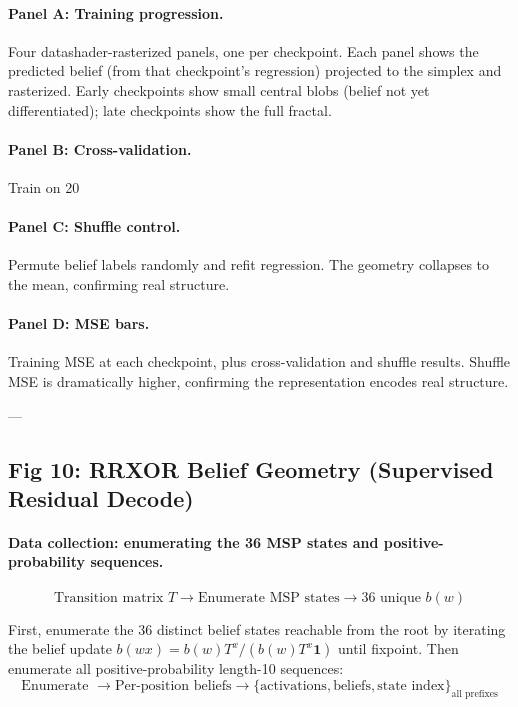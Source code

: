 \documentclass[11pt]{article}
\begin{document}
\paragraph{Panel A: Training progression.}
Four datashader-rasterized panels, one per checkpoint. Each panel shows the predicted belief (from that checkpoint's regression) projected to the simplex and rasterized. Early checkpoints show small central blobs (belief not yet differentiated); late checkpoints show the full fractal.

\paragraph{Panel B: Cross-validation.}
Train on 20%

\paragraph{Panel C: Shuffle control.}
Permute belief labels randomly and refit regression. The geometry collapses to the mean, confirming real structure.

\paragraph{Panel D: MSE bars.}
Training MSE at each checkpoint, plus cross-validation and shuffle results. Shuffle MSE is dramatically higher, confirming the representation encodes real structure.

---

\subsection{Fig 10: RRXOR Belief Geometry (Supervised Residual Decode)}

\paragraph{Data collection: enumerating the 36 MSP states and positive-probability sequences.}
\begin{equation}
\text{Transition matrix } T \to \text{Enumerate MSP states} \to 36 \text{ unique } b(w)
\end{equation}

First, enumerate the 36 distinct belief states reachable from the root by iterating the belief update $b(wx) = b(w) T^x / (b(w) T^x \mathbf{1})$ until fixpoint. Then enumerate all positive-probability length-10 sequences:
\begin{equation}
\text{Enumerate } \to \text{Per-position beliefs} \to \{\text{activations}, \text{beliefs}, \text{state index}\}_{\text{all prefixes}}
\end{equation}
\end{document}
